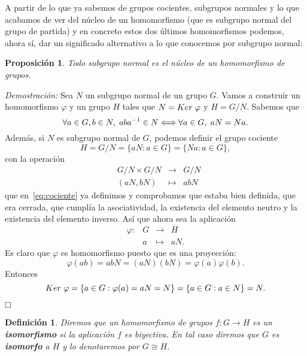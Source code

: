 \documentclass[12pt]{article}
\newtheorem{proposition}[theorem]{Proposición}
\newtheorem{definition}[theorem]{Definición}
\begin{document}
A partir de lo que ya sabemos de grupos cocientes, subgrupos normales y lo que acabamos de ver del núcleo de un homomorfismo (que es subgrupo normal del grupo de partida) y en concreto estos dos últimos homomorfismos podemos, ahora sí, dar un significado alternativo a lo que conocemos por subgrupo normal:

\begin{proposition} Todo subgrupo normal es el núcleo de un homomorfismo de grupos.
\end{proposition}
\emph{Demostración: } Sea $N$ un subgrupo normal de un grupo $G$. Vamos a construir un homomorfismo $\varphi$ y un grupo $H$ tales que $N = Ker \hspace{0.1cm} \varphi$ y $H = G/N$. Sabemos que $$\forall a \in G, b \in N, \hspace{0.1cm} aba^{-1} \in N \Longleftrightarrow \forall a \in G, \hspace{0.1cm} aN = Na.$$ Además, si $N$ es subgrupo normal de $G$, podemos definir el grupo cociente $$H = G/N  = \lbrace aN :a \in G \rbrace = \lbrace Na : a \in G\rbrace,$$ con la operación $$\begin{array}{rccl}
&G/N \times G/N & \longrightarrow & G/N\\
&(aN,bN)& \longmapsto &abN
\end{array}
$$ que en~\ref{eq:cociente} ya definimos y comprobamos que estaba bien definida, que era cerrada, que cumplía la asociatividad, la existencia del elemento neutro y la existencia del elemento inverso. Así que ahora sea la aplicación $$\begin{array}{rccl}
\varphi \colon &G & \longrightarrow & H\\
&a & \longmapsto &aN.
\end{array}
$$  Es claro que $\varphi$ es homomorfismo puesto que es una proyección: $$\varphi(ab) = abN = (aN)(bN) = \varphi(a) \varphi(b).$$ Entonces $$Ker\hspace{0.1cm} \varphi = \lbrace a \in G : \varphi(a) = aN = N \rbrace = \lbrace a \in G : a \in N \rbrace = N.$$

$\hfill \square$

\begin{definition}Diremos que un homomorfismo de grupos $f \colon G \longrightarrow H$ es un \textbf{isomorfismo} si la aplicación $f$ es biyectiva. En tal caso diremos que $G$ es \textbf{isomorfo} a $H$ y lo denotaremos por $G \cong H$.
\end{definition}
\end{document}
